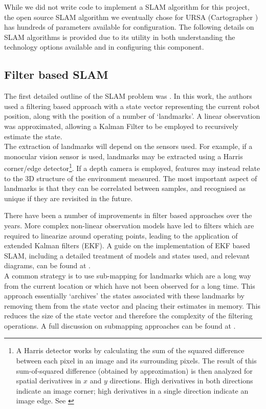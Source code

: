 \documentclass[capstone_report.tex]{subfiles}
\begin{document}
While we did not write code to implement a SLAM algorithm for this project, the open source SLAM algorithm we eventually chose for URSA (Cartographer \cite{cart}) has hundreds of parameters available for configuration. The following details on SLAM algorithms is provided due to its utility in both understanding the technology options available and in configuring this component.

\subsection{Filter based SLAM}
The first detailed outline of the SLAM problem was \cite{smithcheese}. In this work, the authors used a filtering based approach with a state vector representing the current robot position, along with the position of a number of `landmarks'. A linear observation was approximated, allowing a Kalman Filter to be employed to recursively estimate the state.\\

The extraction of landmarks will depend on the sensors used. For example, if a monocular vision sensor is used, landmarks may be extracted using a Harris corner/edge detector\footnote{A Harris detector works by calculating the sum of the squared difference between each pixel in an image and its surrounding pixels. The result of this sum-of-squared difference (obtained by approximation) is then analyzed for spatial derivatives in $x$ and $y$ directions. High derivatives in both directions indicate an image corner; high derivatives in a single direction indicate an image edge. See \cite{harris}}. If a depth camera is employed, features may instead relate to the 3D structure of the environment measured. The most important aspect of landmarks is that they can be correlated between samples, and recognised as unique if they are revisited in the future.

There have been a number of improvements in filter based approaches over the years. More complex non-linear observation models have led to filters which are required to linearize around operating points, leading to the application of extended Kalman filters (EKF). A guide on the implementation of EKF based SLAM, including a detailed treatment of models and states used, and relevant diagrams, can be found at \cite{ekftutorial}.\\ 

A common strategy is to use sub-mapping for landmarks which are a long way from the current location or which have not been observed for a long time. This approach essentially `archives' the states associated with these landmarks by removing them from the state vector and placing their estimates in memory. This reduces the size of the state vector and therefore the complexity of the filtering operations. A full discussion on submapping approaches can be found at \cite{slamoverview}.
\end{document}
